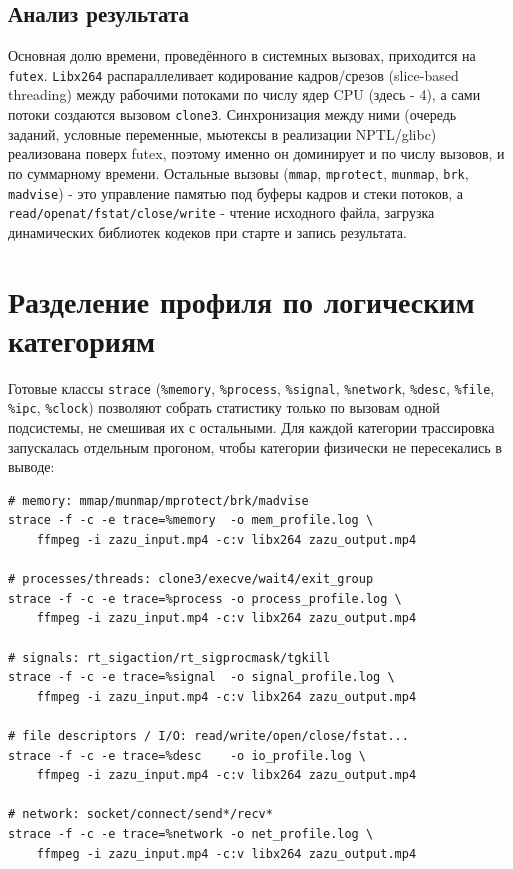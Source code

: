 \documentclass[12pt,a4paper]{article}
\begin{document}
\subsection{Анализ результата}
Основная долю времени, проведённого в системных вызовах, приходится на \texttt{futex}.
\texttt{Libx264} распараллеливает кодирование кадров/срезов (slice-based
threading) между рабочими потоками по числу ядер CPU (здесь - 4), а сами потоки
создаются вызовом \texttt{clone3}. Синхронизация между ними (очередь заданий, условные переменные, мьютексы
в реализации NPTL/glibc) реализована поверх futex, поэтому именно он доминирует
и по числу вызовов, и по суммарному времени. Остальные вызовы (\texttt{mmap},
\texttt{mprotect}, \texttt{munmap}, \texttt{brk}, \texttt{madvise}) - это управление
памятью под буферы кадров и стеки потоков, а \texttt{read/openat/fstat/close/write} -
чтение исходного файла, загрузка динамических библиотек кодеков при старте и запись
результата.


\section{Разделение профиля по логическим категориям}
\label{sec:categories}

Готовые классы \texttt{strace} (\texttt{\%memory}, \texttt{\%process}, \texttt{\%signal},
\texttt{\%network}, \texttt{\%desc}, \texttt{\%file}, \texttt{\%ipc}, \texttt{\%clock})
позволяют собрать статистику только по вызовам одной подсистемы, не смешивая их с
остальными. Для каждой категории трассировка запускалась отдельным прогоном, чтобы категории физически не
пересекались в выводе:

\begin{lstlisting}
# memory: mmap/munmap/mprotect/brk/madvise
strace -f -c -e trace=%memory  -o mem_profile.log \
    ffmpeg -i zazu_input.mp4 -c:v libx264 zazu_output.mp4

# processes/threads: clone3/execve/wait4/exit_group
strace -f -c -e trace=%process -o process_profile.log \
    ffmpeg -i zazu_input.mp4 -c:v libx264 zazu_output.mp4

# signals: rt_sigaction/rt_sigprocmask/tgkill
strace -f -c -e trace=%signal  -o signal_profile.log \
    ffmpeg -i zazu_input.mp4 -c:v libx264 zazu_output.mp4

# file descriptors / I/O: read/write/open/close/fstat...
strace -f -c -e trace=%desc    -o io_profile.log \
    ffmpeg -i zazu_input.mp4 -c:v libx264 zazu_output.mp4

# network: socket/connect/send*/recv*
strace -f -c -e trace=%network -o net_profile.log \
    ffmpeg -i zazu_input.mp4 -c:v libx264 zazu_output.mp4
\end{lstlisting}
\end{document}
